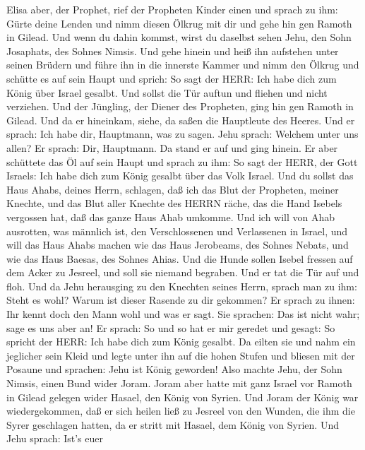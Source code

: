  Elisa aber, der Prophet, rief der Propheten Kinder einen
und sprach zu ihm: Gürte deine Lenden und nimm diesen Ölkrug mit dir und
gehe hin gen Ramoth in Gilead.  Und wenn du dahin kommst,
wirst du daselbst sehen Jehu, den Sohn Josaphats, des Sohnes Nimsis. Und
gehe hinein und heiß ihn aufstehen unter seinen Brüdern und führe ihn in
die innerste Kammer  und nimm den Ölkrug und schütte es auf
sein Haupt und sprich: So sagt der HERR: Ich habe dich zum König über
Israel gesalbt. Und sollst die Tür auftun und fliehen und nicht
verziehen.  Und der Jüngling, der Diener des Propheten, ging
hin gen Ramoth in Gilead.  Und da er hineinkam, siehe, da
saßen die Hauptleute des Heeres. Und er sprach: Ich habe dir, Hauptmann,
was zu sagen. Jehu sprach: Welchem unter uns allen? Er sprach: Dir,
Hauptmann.  Da stand er auf und ging hinein. Er aber
schüttete das Öl auf sein Haupt und sprach zu ihm: So sagt der HERR, der
Gott Israels: Ich habe dich zum König gesalbt über das Volk Israel.
 Und du sollst das Haus Ahabs, deines Herrn, schlagen, daß
ich das Blut der Propheten, meiner Knechte, und das Blut aller Knechte
des HERRN räche, das die Hand Isebels vergossen hat,  daß
das ganze Haus Ahab umkomme. Und ich will von Ahab ausrotten, was
männlich ist, den Verschlossenen und Verlassenen in Israel, 
und will das Haus Ahabs machen wie das Haus Jerobeams, des Sohnes
Nebats, und wie das Haus Baesas, des Sohnes Ahias.  Und die
Hunde sollen Isebel fressen auf dem Acker zu Jesreel, und soll sie
niemand begraben. Und er tat die Tür auf und floh.  Und da
Jehu herausging zu den Knechten seines Herrn, sprach man zu ihm: Steht
es wohl? Warum ist dieser Rasende zu dir gekommen? Er sprach zu ihnen:
Ihr kennt doch den Mann wohl und was er sagt.  Sie
sprachen: Das ist nicht wahr; sage es uns aber an! Er sprach: So und so
hat er mir geredet und gesagt: So spricht der HERR: Ich habe dich zum
König gesalbt.  Da eilten sie und nahm ein jeglicher sein
Kleid und legte unter ihn auf die hohen Stufen und bliesen mit der
Posaune und sprachen: Jehu ist König geworden!  Also machte
Jehu, der Sohn Nimsis, einen Bund wider Joram. Joram aber hatte mit ganz
Israel vor Ramoth in Gilead gelegen wider Hasael, den König von Syrien.
 Und Joram der König war wiedergekommen, daß er sich heilen
ließ zu Jesreel von den Wunden, die ihm die Syrer geschlagen hatten, da
er stritt mit Hasael, dem König von Syrien. Und Jehu sprach: Ist's euer
